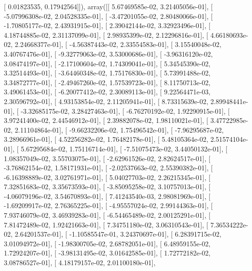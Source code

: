 \documentclass{article}
\begin{document}
       [ 0.01823535,  0.17942564]]), array([[  5.67469585e-02,   3.21405056e-01],
       [ -5.07996308e-02,   2.04528335e-01],
       [ -3.47201055e-02,   2.80480066e-01],
       [ -1.70805177e-02,   2.43931915e-01],
       [  2.39042144e-02,   3.32923496e-01],
       [  4.18744885e-02,   2.31137099e-01],
       [  2.98935399e-02,   2.12296816e-01],
       [  4.66180693e-02,   2.24668377e-01],
       [ -4.56387443e-02,   2.33554583e-01],
       [  3.15540048e-02,   3.40767476e-01],
       [ -9.32779063e-02,   3.53000686e-01],
       [ -3.96316120e-02,   3.08474197e-01],
       [ -2.17100604e-02,   1.74309041e-01],
       [  5.34545390e-02,   3.32514493e-01],
       [ -3.64460348e-02,   1.75176830e-01],
       [  5.73991488e-02,   3.34872777e-01],
       [ -2.49467260e-02,   1.57539723e-01],
       [  8.11750713e-02,   3.49061453e-01],
       [ -6.20077412e-02,   2.30089113e-01],
       [  9.22564471e-03,   2.30596792e-01],
       [  4.93153854e-02,   2.11205941e-01],
       [  8.73315639e-02,   2.89948441e-01],
       [ -3.32685175e-02,   3.28427463e-01],
       [ -6.76270192e-02,   1.92290915e-01],
       [  3.97241400e-02,   2.44546912e-01],
       [  2.39882078e-02,   1.98110021e-01],
       [  3.47722985e-02,   2.11104864e-01],
       [ -9.66232206e-02,   1.75496542e-01],
       [ -7.96295687e-02,   3.28966961e-01],
       [  4.52256282e-02,   1.76482178e-01],
       [  5.48105364e-02,   2.51574104e-01],
       [  5.67295684e-02,   1.75116714e-01],
       [ -7.51075473e-02,   3.44050132e-01],
       [  1.08357049e-02,   3.55703075e-01],
       [ -2.62961526e-02,   2.82624517e-01],
       [ -3.76862154e-02,   1.58171931e-01],
       [ -2.02537663e-02,   2.55390382e-01],
       [ -6.16398889e-02,   3.02761971e-01],
       [  5.04027703e-02,   2.26215345e-01],
       [  7.32851683e-02,   3.35673593e-01],
       [ -3.85095258e-02,   3.10757013e-01],
       [ -4.06079196e-02,   3.54670893e-01],
       [  7.41243540e-03,   2.98081969e-01],
       [ -1.69209917e-02,   2.76365225e-01],
       [ -4.95557024e-02,   2.99144363e-01],
       [  7.93746079e-02,   3.46939283e-01],
       [ -6.54465489e-02,   2.00125291e-01],
       [  7.81472489e-02,   1.92421663e-01],
       [  7.34751180e-02,   3.06310543e-01],
       [  7.36534222e-02,   2.64201537e-01],
       [ -1.10585547e-01,   3.24370697e-01],
       [  6.28391715e-02,   3.01094972e-01],
       [ -1.98300705e-02,   2.68782051e-01],
       [  6.48959155e-02,   1.72924207e-01],
       [ -3.98131495e-02,   3.01642585e-01],
       [  1.72772182e-02,   3.08786527e-01],
       [  4.18179157e-02,   2.01100180e-01],
\end{document}
